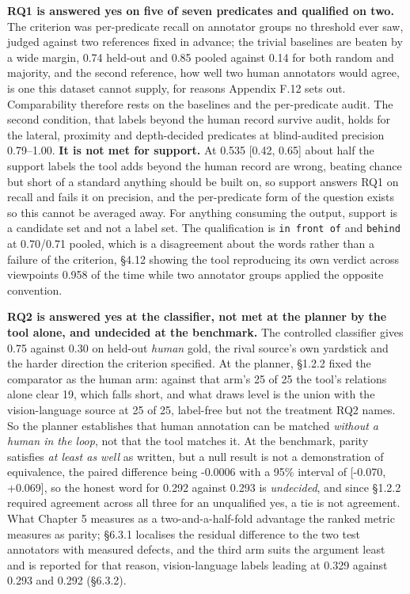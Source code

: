 \textbf{RQ1 is answered yes on five of seven predicates and qualified on two.} The criterion was per-predicate recall on annotator groups no threshold ever saw, judged against two references fixed in advance; the trivial baselines are beaten by a wide margin, 0.74 held-out and 0.85 pooled against 0.14 for both random and majority, and the second reference, how well two human annotators would agree, is one this dataset cannot supply, for reasons Appendix F.12 sets out. Comparability therefore rests on the baselines and the per-predicate audit. The second condition, that labels beyond the human record survive audit, holds for the lateral, proximity and depth-decided predicates at blind-audited precision 0.79--1.00. \textbf{It is not met for support.} At 0.535 [0.42, 0.65] about half the support labels the tool adds beyond the human record are wrong, beating chance but short of a standard anything should be built on, so support answers RQ1 on recall and fails it on precision, and the per-predicate form of the question exists so this cannot be averaged away. For anything consuming the output, support is a candidate set and not a label set. The qualification is \texttt{in front of} and \texttt{behind} at 0.70/0.71 pooled, which is a disagreement about the words rather than a failure of the criterion, \S{}4.12 showing the tool reproducing its own verdict across viewpoints 0.958 of the time while two annotator groups applied the opposite convention.

\textbf{RQ2 is answered yes at the classifier, not met at the planner by the tool alone, and undecided at the benchmark.} The controlled classifier gives 0.75 against 0.30 on held-out \textit{human} gold, the rival source's own yardstick and the harder direction the criterion specified. At the planner, \S{}1.2.2 fixed the comparator as the human arm: against that arm's 25 of 25 the tool's relations alone clear 19, which falls short, and what draws level is the union with the vision-language source at 25 of 25, label-free but not the treatment RQ2 names. So the planner establishes that human annotation can be matched \textit{without a human in the loop}, not that the tool matches it. At the benchmark, parity satisfies \textit{at least as well} as written, but a null result is not a demonstration of equivalence, the paired difference being -0.0006 with a 95\% interval of [-0.070, +0.069], so the honest word for 0.292 against 0.293 is \textit{undecided}, and since \S{}1.2.2 required agreement across all three for an unqualified yes, a tie is not agreement. What Chapter 5 measures as a two-and-a-half-fold advantage the ranked metric measures as parity; \S{}6.3.1 localises the residual difference to the two test annotators with measured defects, and the third arm suits the argument least and is reported for that reason, vision-language labels leading at 0.329 against 0.293 and 0.292 (\S{}6.3.2).

